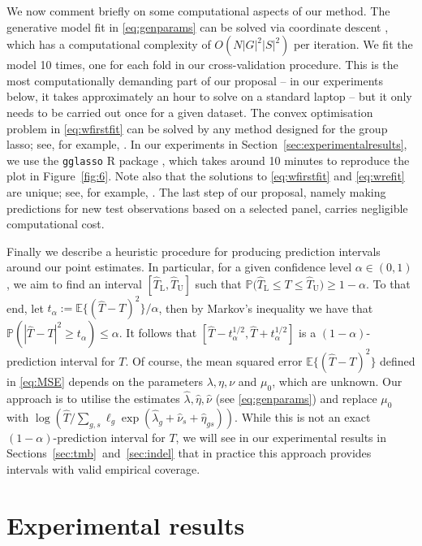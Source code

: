 \documentclass[../thesis.tex]{subfiles}
\begin{document}
We now comment briefly on some computational aspects of our method. The generative model fit in \eqref{eq:genparams} can be solved via coordinate descent \citep[see, for example,][]{friedman_regularization_2010}, which has a computational complexity of $O(N|G|^2|S|^2)$ per iteration.  We fit the model 10 times, one for each fold in our cross-validation procedure. This is the most computationally demanding part of our proposal -- in our experiments below, it takes approximately an hour to solve on a standard laptop -- but it only needs to be carried out once for a given dataset.  The convex optimisation problem in \eqref{eq:wfirstfit} can be solved by any method designed for the group \gls{lasso}; see, for example, \citet{yang_fast_2015}. In our experiments in Section~\ref{sec:experimentalresults}, we use the \texttt{gglasso} R package \citep{yang_gglasso_2020}, which takes around 10 minutes to reproduce the plot in Figure~\ref{fig:6}. Note also that the solutions to \eqref{eq:wfirstfit} and \eqref{eq:wrefit} are unique; see, for example, \citet[Theorem~1]{roth_group-lasso_2008}.  The last step of our proposal, namely making predictions for new test observations based on a selected panel, carries negligible computational cost.  

Finally we describe a heuristic procedure for producing prediction intervals around our point estimates.  In particular, for a given confidence level $\alpha \in (0,1)$, we aim to find an interval $[\hat{T}_{\mathrm{L}}, \hat{T}_{\mathrm{U}}]$ such that $\mathbb{P}\bigl(\hat{T}_{\mathrm{L}} \leq T \leq \hat{T}_{\mathrm{U}}\bigr) \geq 1- \alpha.$  To that end, let $t_\alpha := \mathbb{E}\{(\hat{T} - T)^2\}/\alpha$, then by Markov's inequality we have that $\mathbb{P}(|\hat{T} - T|^2 \geq t_\alpha) \leq \alpha$. It follows that $[\hat{T} - t_\alpha^{1/2} , \hat{T}+ t_\alpha^{1/2}]$ is a $(1-\alpha)$-prediction interval for $T$. Of course, the mean squared error $\mathbb{E}\{(\hat{T}-T)^2\}$ defined in \eqref{eq:MSE} depends on the parameters $\lambda, \eta, \nu$ and $\mu_0$, which are unknown.  Our approach is to utilise the estimates $\hat{\lambda}, \hat{\eta}, \hat{\nu}$ (see \eqref{eq:genparams}) and replace $\mu_0$ with $\log(\hat{T}/\sum_{g,s}\ell_g\exp(\hat{\lambda}_g + \hat{\nu}_s + \hat{\eta}_{gs}))$. While this is not an exact $(1-\alpha)$-prediction interval for $T$,  we will see in our experimental results in Sections~\ref{sec:tmb}~and~\ref{sec:indel} that in practice this approach provides intervals with valid empirical coverage.  

\section{Experimental results \label{sec:experimentalresults}}
\end{document}

